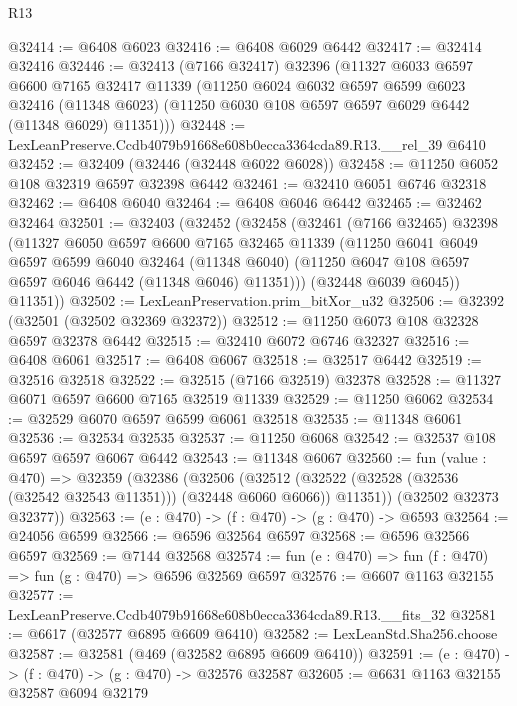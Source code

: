 \begin{lexlean}{R13}
\begin{coremodule}
@32414 := @6408 @6023
@32416 := @6408 @6029 @6442
@32417 := @32414 @32416
@32446 := @32413
    (@7166 @32417)
    @32396
    (@11327
      @6033
      @6597
      @6600
      @7165
      @32417
      @11339
      (@11250
        @6024
        @6032
        @6597
        @6599
        @6023
        @32416
        (@11348 @6023)
        (@11250 @6030 @108 @6597 @6597 @6029 @6442 (@11348 @6029) @11351)))
@32448 := LexLeanPreserve.Ccdb4079b91668e608b0ecca3364cda89.R13.__rel_39 @6410
@32452 := @32409 (@32446 (@32448 @6022 @6028))
@32458 := @11250 @6052 @108 @32319 @6597 @32398 @6442
@32461 := @32410 @6051 @6746 @32318
@32462 := @6408 @6040
@32464 := @6408 @6046 @6442
@32465 := @32462 @32464
@32501 := @32403
    (@32452
      (@32458
        (@32461
          (@7166 @32465)
          @32398
          (@11327
            @6050
            @6597
            @6600
            @7165
            @32465
            @11339
            (@11250
              @6041
              @6049
              @6597
              @6599
              @6040
              @32464
              (@11348 @6040)
              (@11250 @6047 @108 @6597 @6597 @6046 @6442 (@11348 @6046) @11351)))
          (@32448 @6039 @6045))
        @11351))
@32502 := LexLeanPreservation.prim_bitXor_u32
@32506 := @32392 (@32501 (@32502 @32369 @32372))
@32512 := @11250 @6073 @108 @32328 @6597 @32378 @6442
@32515 := @32410 @6072 @6746 @32327
@32516 := @6408 @6061
@32517 := @6408 @6067
@32518 := @32517 @6442
@32519 := @32516 @32518
@32522 := @32515 (@7166 @32519) @32378
@32528 := @11327 @6071 @6597 @6600 @7165 @32519 @11339
@32529 := @11250 @6062
@32534 := @32529 @6070 @6597 @6599 @6061 @32518
@32535 := @11348 @6061
@32536 := @32534 @32535
@32537 := @11250 @6068
@32542 := @32537 @108 @6597 @6597 @6067 @6442
@32543 := @11348 @6067
@32560 := fun (value : @470) =>
  @32359
    (@32386
      (@32506
        (@32512 (@32522 (@32528 (@32536 (@32542 @32543 @11351))) (@32448 @6060 @6066)) @11351))
      (@32502 @32373 @32377))
@32563 := (e : @470) -> (f : @470) -> (g : @470) -> @6593
@32564 := @24056 @6599
@32566 := @6596 @32564 @6597
@32568 := @6596 @32566 @6597
@32569 := @7144 @32568
@32574 := fun (e : @470) => fun (f : @470) => fun (g : @470) => @6596 @32569 @6597
@32576 := @6607 @1163 @32155
@32577 := LexLeanPreserve.Ccdb4079b91668e608b0ecca3364cda89.R13.__fits_32
@32581 := @6617 (@32577 @6895 @6609 @6410)
@32582 := LexLeanStd.Sha256.choose
@32587 := @32581 (@469 (@32582 @6895 @6609 @6410))
@32591 := (e : @470) -> (f : @470) -> (g : @470) -> @32576 @32587
@32605 := @6631
    @1163
    @32155
    @32587
    @6094
    @32179

\end{coremodule}
\end{lexlean}
